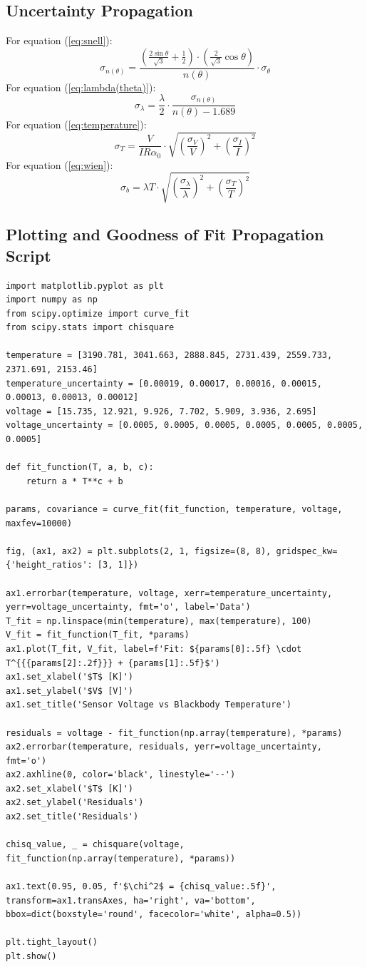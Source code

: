 \documentclass[12pt]{article}
\begin{document}
\newpage
\subsection*{Uncertainty Propagation} \label{sec:unc}
For equation (\ref{eq:snell}):
\[
\sigma_{n(\theta)}=\frac{\left(\frac{2\sin\theta}{\sqrt3}+\frac{1}{2}\right)\cdot\left(\frac{2}{\sqrt3}\cos\theta\right)}{n(\theta)}\cdot\sigma_\theta
\]
For equation (\ref{eq:lambda(theta)}):
\[
\sigma_\lambda=\frac{\lambda}{2}\cdot \frac{\sigma_{n(\theta)}}{n(\theta)-1.689}
\]
For equation (\ref{eq:temperature}):
\[
\sigma_T=\frac{V}{IR\alpha_0}\cdot\sqrt{\left(\frac{\sigma_V}{V}\right)^2+\left(\frac{\sigma_I}{I}\right)^2}
\]
For equation (\ref{eq:wien}):
\[
\sigma_b=\lambda T\cdot\sqrt{\left(\frac{\sigma_\lambda}{\lambda}\right)^2+\left(\frac{\sigma_T}{T}\right)^2}
\]
\newpage
\subsection*{Plotting and Goodness of Fit Propagation Script} \label{sec:python}
\begin{lstlisting}
import matplotlib.pyplot as plt
import numpy as np
from scipy.optimize import curve_fit
from scipy.stats import chisquare

temperature = [3190.781, 3041.663, 2888.845, 2731.439, 2559.733, 2371.691, 2153.46]
temperature_uncertainty = [0.00019, 0.00017, 0.00016, 0.00015, 0.00013, 0.00013, 0.00012]
voltage = [15.735, 12.921, 9.926, 7.702, 5.909, 3.936, 2.695]
voltage_uncertainty = [0.0005, 0.0005, 0.0005, 0.0005, 0.0005, 0.0005, 0.0005]

def fit_function(T, a, b, c):
    return a * T**c + b

params, covariance = curve_fit(fit_function, temperature, voltage, maxfev=10000)

fig, (ax1, ax2) = plt.subplots(2, 1, figsize=(8, 8), gridspec_kw={'height_ratios': [3, 1]})

ax1.errorbar(temperature, voltage, xerr=temperature_uncertainty, yerr=voltage_uncertainty, fmt='o', label='Data')
T_fit = np.linspace(min(temperature), max(temperature), 100)
V_fit = fit_function(T_fit, *params)
ax1.plot(T_fit, V_fit, label=f'Fit: ${params[0]:.5f} \cdot T^{{{params[2]:.2f}}} + {params[1]:.5f}$')
ax1.set_xlabel('$T$ [K]')
ax1.set_ylabel('$V$ [V]')
ax1.set_title('Sensor Voltage vs Blackbody Temperature')

residuals = voltage - fit_function(np.array(temperature), *params)
ax2.errorbar(temperature, residuals, yerr=voltage_uncertainty, fmt='o')
ax2.axhline(0, color='black', linestyle='--')
ax2.set_xlabel('$T$ [K]')
ax2.set_ylabel('Residuals')
ax2.set_title('Residuals')

chisq_value, _ = chisquare(voltage, fit_function(np.array(temperature), *params))

ax1.text(0.95, 0.05, f'$\chi^2$ = {chisq_value:.5f}', transform=ax1.transAxes, ha='right', va='bottom', bbox=dict(boxstyle='round', facecolor='white', alpha=0.5))

plt.tight_layout()
plt.show()

\end{lstlisting}
\end{document}
